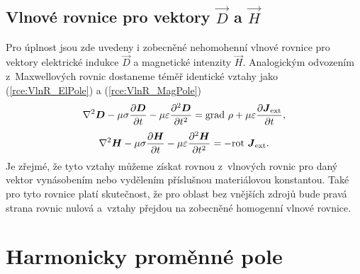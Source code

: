 \subsection*{Vlnové rovnice pro vektory $\vec D$ a $\vec H$}
Pro úplnost jsou zde uvedeny i zobecněné nehomohenní vlnové rovnice pro vektory elektrické indukce $\vec D$ a magnetické intenzity $\vec H$. Analogickým odvozením z~Maxwellových rovnic dostaneme téměř identické vztahy jako (\ref{rce:VlnR_ElPole}) a (\ref{rce:VlnR_MagPole}) 
\begin{displaymath}
	\nabla^{2}\mbox{\boldmath$D$} -\mu\sigma\frac{\partial\mbox{\boldmath$D$}}{\partial t}-\mu\varepsilon\frac{\partial^{2}\mbox{\boldmath$D$}}{\partial t^{2}} = \mathrm{grad}\ \rho + \mu\varepsilon\frac{\partial\mbox{\boldmath$J$}_{\mathrm{ext}}}{\partial t},
\end{displaymath}
\begin{displaymath}
	\nabla^{2}\mbox{\boldmath$H$} -\mu\sigma\frac{\partial\mbox{\boldmath$H$}}{\partial t}-\mu\varepsilon\frac{\partial^{2}\mbox{\boldmath$H$}}{\partial t^{2}}= -\mathrm{rot}\ \mbox{\boldmath$J$}_{\mathrm{ext}}.
\end{displaymath}
Je zřejmé, že tyto vztahy můžeme získat rovnou z~vlnových rovnic pro daný vektor vynásobením nebo vydělením příslušnou materiálovou konstantou. Také pro tyto rovnice platí skutečnost, že pro oblast bez vnějších zdrojů bude pravá strana rovnic nulová a~vztahy přejdou na zobecněné homogenní vlnové rovnice.

\section{Harmonicky proměnné pole} \label{sec:Odvozeni_HarmPole}

